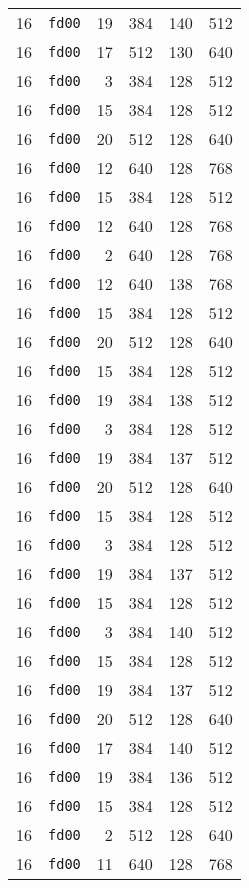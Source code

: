 \documentclass{article}
\begin{document}
\begin{table}[h!]
\begin{tabular}{llrrrl}
    16 & \texttt{fd00} & 19 & 384 & 140 & 512 \\
    16 & \texttt{fd00} & 17 & 512 & 130 & 640 \\
    16 & \texttt{fd00} & 3 & 384 & 128 & 512 \\
    16 & \texttt{fd00} & 15 & 384 & 128 & 512 \\
    16 & \texttt{fd00} & 20 & 512 & 128 & 640 \\
    16 & \texttt{fd00} & 12 & 640 & 128 & 768 \\
    16 & \texttt{fd00} & 15 & 384 & 128 & 512 \\
    16 & \texttt{fd00} & 12 & 640 & 128 & 768 \\
    16 & \texttt{fd00} & 2 & 640 & 128 & 768 \\
    16 & \texttt{fd00} & 12 & 640 & 138 & 768 \\
    16 & \texttt{fd00} & 15 & 384 & 128 & 512 \\
    16 & \texttt{fd00} & 20 & 512 & 128 & 640 \\
    16 & \texttt{fd00} & 15 & 384 & 128 & 512 \\
    16 & \texttt{fd00} & 19 & 384 & 138 & 512 \\
    16 & \texttt{fd00} & 3 & 384 & 128 & 512 \\
    16 & \texttt{fd00} & 19 & 384 & 137 & 512 \\
    16 & \texttt{fd00} & 20 & 512 & 128 & 640 \\
    16 & \texttt{fd00} & 15 & 384 & 128 & 512 \\
    16 & \texttt{fd00} & 3 & 384 & 128 & 512 \\
    16 & \texttt{fd00} & 19 & 384 & 137 & 512 \\
    16 & \texttt{fd00} & 15 & 384 & 128 & 512 \\
    16 & \texttt{fd00} & 3 & 384 & 140 & 512 \\
    16 & \texttt{fd00} & 15 & 384 & 128 & 512 \\
    16 & \texttt{fd00} & 19 & 384 & 137 & 512 \\
    16 & \texttt{fd00} & 20 & 512 & 128 & 640 \\
    16 & \texttt{fd00} & 17 & 384 & 140 & 512 \\
    16 & \texttt{fd00} & 19 & 384 & 136 & 512 \\
    16 & \texttt{fd00} & 15 & 384 & 128 & 512 \\
    16 & \texttt{fd00} & 2 & 512 & 128 & 640 \\
    16 & \texttt{fd00} & 11 & 640 & 128 & 768 \\

\end{tabular}
\end{table}
\end{document}
